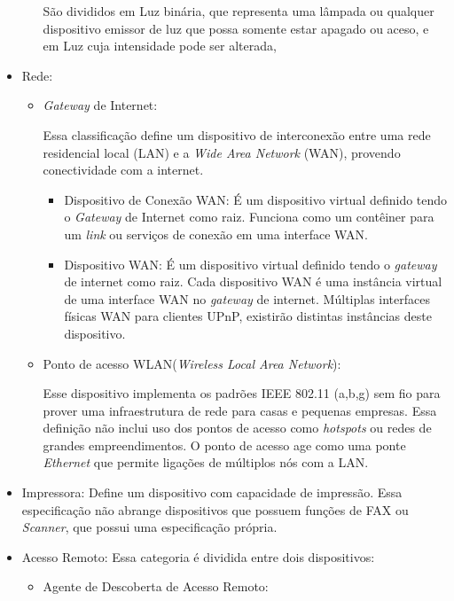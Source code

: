\begin{itemize}
\begin{itemize}
			São divididos em Luz binária, que representa uma lâmpada ou qualquer dispositivo emissor de luz que possa somente estar apagado ou aceso, e em Luz cuja intensidade pode ser alterada, 
	\end{itemize}

\item Rede:
	\begin{itemize}
		\item \emph{Gateway} de Internet:
			
			Essa classificação define um dispositivo de interconexão entre uma rede residencial local (LAN) e a \emph{Wide Area Network} (WAN), provendo conectividade com a internet.
			\begin{itemize}
				\item Dispositivo de Conexão WAN: É um dispositivo virtual definido tendo o \emph{Gateway} de Internet como raiz. Funciona como um contêiner para um \emph{link} ou serviços de conexão em uma interface WAN. 
				\item Dispositivo WAN: É um dispositivo virtual definido tendo o \emph{gateway} de internet como raiz. Cada dispositivo WAN é uma instância virtual de uma interface WAN no \emph{gateway} de internet. Múltiplas interfaces físicas WAN para clientes UPnP, existirão distintas instâncias deste dispositivo.
			\end{itemize}

		\item Ponto de acesso WLAN(\emph{Wireless Local Area Network}):
			
			Esse dispositivo implementa os padrões IEEE 802.11 (a,b,g) sem fio para prover uma infraestrutura de rede para casas e pequenas empresas. Essa definição não inclui uso dos pontos de acesso como \emph{hotspots} ou redes de grandes empreendimentos. O ponto de acesso age como uma ponte \emph{Ethernet} que permite ligações de múltiplos nós com a LAN.
	\end{itemize}

\item Impressora:
	Define um dispositivo com capacidade de impressão. Essa especificação não abrange dispositivos que possuem funções de FAX ou \emph{Scanner}, que possui uma especificação própria.

\item Acesso Remoto:
	Essa categoria é dividida entre dois dispositivos:
	\begin{itemize}
		\item Agente de Descoberta de Acesso Remoto:


\end{itemize}
\end{itemize}
